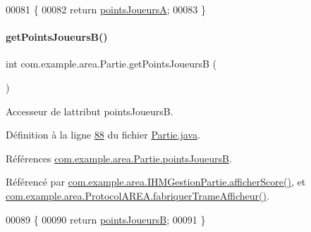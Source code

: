 \begin{DoxyCode}
00081     \{
00082         \textcolor{keywordflow}{return} \hyperlink{classcom_1_1example_1_1area_1_1_partie_ad1075e561acb71ac3307570f79795b1c}{pointsJoueursA};
00083     \}
\end{DoxyCode}
\mbox{\label{classcom_1_1example_1_1area_1_1_partie_a376bb79a67c311e1eb681387e9440bbd}} 
\paragraph{\texorpdfstring{get\+Points\+Joueurs\+B()}{getPointsJoueursB()}}
{\footnotesize\ttfamily int com.\+example.\+area.\+Partie.\+get\+Points\+JoueursB (\begin{DoxyParamCaption}{ }\end{DoxyParamCaption})}



Accesseur de l\textquotesingle{}attribut points\+JoueursB. 



Définition à la ligne \hyperlink{_partie_8java_source_l00088}{88} du fichier \hyperlink{_partie_8java_source}{Partie.\+java}.



Références \hyperlink{_partie_8java_source_l00040}{com.\+example.\+area.\+Partie.\+points\+JoueursB}.



Référencé par \hyperlink{_i_h_m_gestion_partie_8java_source_l00435}{com.\+example.\+area.\+I\+H\+M\+Gestion\+Partie.\+afficher\+Score()}, et \hyperlink{_protocol_a_r_e_a_8java_source_l00048}{com.\+example.\+area.\+Protocol\+A\+R\+E\+A.\+fabriquer\+Trame\+Afficheur()}.


\begin{DoxyCode}
00089     \{
00090         \textcolor{keywordflow}{return} \hyperlink{classcom_1_1example_1_1area_1_1_partie_ae1ceb321b45437487124b1d886c7297c}{pointsJoueursB};
00091     \}
\end{DoxyCode}
\mbox{\label{classcom_1_1example_1_1area_1_1_partie_a34f75da57f51b710fccbce4aafda28d4}} 
